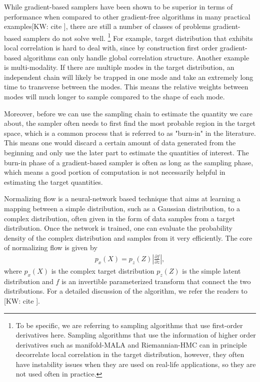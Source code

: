 \documentclass[twocolumn]{aastex631}
\newcommand{\kw}[1]{{\color{rb4}[KW: #1 ]}}
\begin{document}
While gradient-based samplers have been shown to be superior in terms of
performance when compared to other gradient-free algorithms in many practical
examples\kw{cite}, there are still a number of classes of problems
gradient-based samplers do not solve well. \footnote{To be specific, we are
referring to sampling algorithms that use first-order derivatives here. Sampling
algorithms that use the information of higher order derivatives such as manifold-MALA
and Riemannian-HMC can in principle decorrelate local correlation in the target
distribution, however, they often have instability issues when they are used on
real-life applications, so they are not used often in practice.} For example,
target distribution that exhibits local correlation is hard to deal with,
since by construction first order gradient-based algorithms can only handle
global correlation structure. Another example is multi-modality. If there are
multiple modes in the target distribution, an independent chain will likely 
be trapped in one mode and take an extremely long time to transverse between the
modes. This means the relative weights between modes will much longer to sample
compared to the shape of each mode.

Moreover, before we can use the sampling chain to estimate the quantity we care about,
the sampler often needs to first find the most probable region in the target
space, which is a common process that is referred to as "burn-in" in the
literature. This means one would discard a certain amount of data generated from
the beginning and only use the later part to estimate the quantities of
interest. The burn-in phase of a gradient-based sampler is often as long as the
sampling phase, which means a good portion of computation is not necessarily
helpful in estimating the target quantities.

Normalizing flow is a neural-network based technique that aims at learning a
mapping between a simple distribution, such as a Gaussian distribution, to a
complex distribution, often given in the form of data samples from a target
distribution. Once the network is trained, one can evaluate the probability
density of the complex distribution and samples from it very efficiently.
The core of normalizing flow is given by
\begin{align}
    p_x(X) = p_z(Z) \left| \frac{\partial f}{\partial z}\right|,
\end{align}
where $p_x(X)$ is the complex target distribution $p_z(Z)$ is the simple latent
distribution and $f$ is an invertible parameterized transform that
connect the two distributions. For a detailed discussion of the algorithm, we
refer the readers to \kw{cite}.
\end{document}
